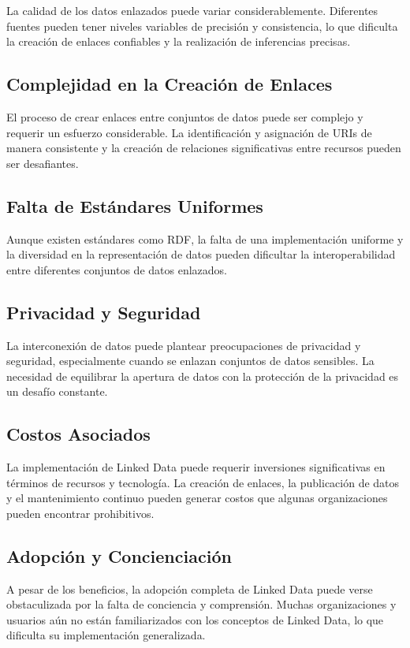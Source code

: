 \documentclass[11pt]{report}
\begin{document}
		La calidad de los datos enlazados puede variar considerablemente. Diferentes fuentes pueden tener niveles variables de precisión y consistencia, lo que dificulta la creación de enlaces confiables y la realización de inferencias precisas.
\subsection*{Complejidad en la Creación de Enlaces}

		El proceso de crear enlaces entre conjuntos de datos puede ser complejo y requerir un esfuerzo considerable. La identificación y asignación de URIs de manera consistente y la creación de relaciones significativas entre recursos pueden ser desafiantes.
\subsection*{Falta de Estándares Uniformes}

		Aunque existen estándares como RDF, la falta de una implementación uniforme y la diversidad en la representación de datos pueden dificultar la interoperabilidad entre diferentes conjuntos de datos enlazados.
\subsection*{Privacidad y Seguridad}

		La interconexión de datos puede plantear preocupaciones de privacidad y seguridad, especialmente cuando se enlazan conjuntos de datos sensibles. La necesidad de equilibrar la apertura de datos con la protección de la privacidad es un desafío constante.
\subsection*{Costos Asociados}

		La implementación de Linked Data puede requerir inversiones significativas en términos de recursos y tecnología. La creación de enlaces, la publicación de datos y el mantenimiento continuo pueden generar costos que algunas organizaciones pueden encontrar prohibitivos.
\subsection*{Adopción y Concienciación}

		A pesar de los beneficios, la adopción completa de Linked Data puede verse obstaculizada por la falta de conciencia y comprensión. Muchas organizaciones y usuarios aún no están familiarizados con los conceptos de Linked Data, lo que dificulta su implementación generalizada.
\end{document}
